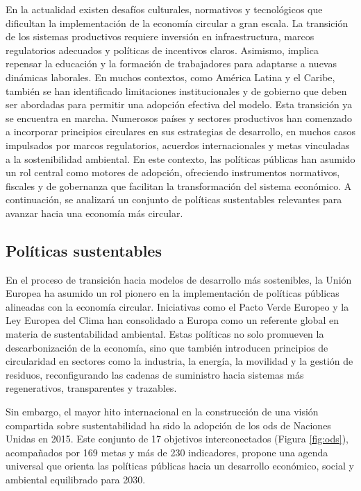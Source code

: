 En la actualidad existen desafíos culturales, normativos y tecnológicos que dificultan la implementación de la economía circular a gran escala. La transición de los sistemas productivos requiere inversión en infraestructura, marcos regulatorios adecuados y políticas de incentivos claros. Asimismo, implica repensar la educación y la formación de trabajadores para adaptarse a nuevas dinámicas laborales. En muchos contextos, como América Latina y el Caribe, también se han identificado limitaciones institucionales y de gobierno que deben ser abordadas para permitir una adopción efectiva del modelo. Esta transición ya se encuentra en marcha. Numerosos países y sectores productivos han comenzado a incorporar principios circulares en sus estrategias de desarrollo, en muchos casos impulsados por marcos regulatorios, acuerdos internacionales y metas vinculadas a la sostenibilidad ambiental. En este contexto, las políticas públicas han asumido un rol central como motores de adopción, ofreciendo instrumentos normativos, fiscales y de gobernanza que facilitan la transformación del sistema económico. A continuación, se analizará un conjunto de políticas sustentables relevantes para avanzar hacia una economía más circular.

\subsection{Políticas sustentables}

En el proceso de transición hacia modelos de desarrollo más sostenibles, la Unión Europea ha asumido un rol pionero en la implementación de políticas públicas alineadas con la economía circular. Iniciativas como el Pacto Verde Europeo y la Ley Europea del Clima han consolidado a Europa como un referente global en materia de sustentabilidad ambiental. Estas políticas no solo promueven la descarbonización de la economía, sino que también introducen principios de circularidad en sectores como la industria, la energía, la movilidad y la gestión de residuos, reconfigurando las cadenas de suministro hacia sistemas más regenerativos, transparentes y trazables.

Sin embargo, el mayor hito internacional en la construcción de una visión compartida sobre sustentabilidad ha sido la adopción de los \acrfull{ods} de Naciones Unidas en 2015. Este conjunto de 17 objetivos interconectados (Figura \ref{fig:ods}), acompañados por 169 metas y más de 230 indicadores, propone una agenda universal que orienta las políticas públicas hacia un desarrollo económico, social y ambiental equilibrado para 2030.

